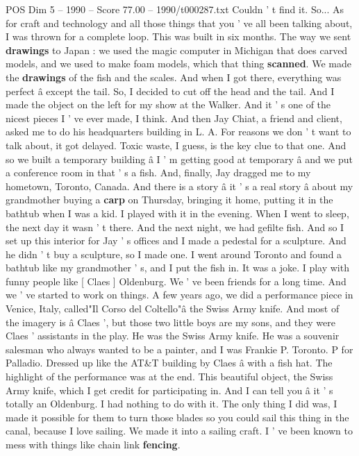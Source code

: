\begin{textsample}{POS Dim 5 – 1990 – Score 77.00 – 1990/t000287.txt}
Couldn ' t find it.
So...
As for craft and technology and all those things that you ' ve all been talking about, I was thrown for a complete loop.
This was built in six months.
The way we sent \textbf{drawings} to Japan : we used the magic computer in Michigan that does carved models, and we used to make foam models, which that thing \textbf{scanned}.
We made the \textbf{drawings} of the fish and the scales.
And when I got there, everything was perfect â except the tail.
So, I decided to cut off the head and the tail.
And I made the object on the left for my show at the Walker.
And it ' s one of the nicest pieces I ' ve ever made, I think.
And then Jay Chiat, a friend and client, asked me to do his headquarters building in L.
A.
For reasons we don ' t want to talk about, it got delayed.
Toxic waste, I guess, is the key clue to that one.
And so we built a temporary building â I ' m getting good at temporary â and we put a conference room in that ' s a fish.
And, finally, Jay dragged me to my hometown, Toronto, Canada.
And there is a story â it ' s a real story â about my grandmother buying a \textbf{carp} on Thursday, bringing it home, putting it in the bathtub when I was a kid.
I played with it in the evening.
When I went to sleep, the next day it wasn ' t there.
And the next night, we had gefilte fish.
And so I set up this interior for Jay ' s offices and I made a pedestal for a sculpture.
And he didn ' t buy a sculpture, so I made one.
I went around Toronto and found a bathtub like my grandmother ' s, and I put the fish in.
It was a joke.
I play with funny people like [ Claes ] Oldenburg.
We ' ve been friends for a long time.
And we ' ve started to work on things.
A few years ago, we did a performance piece in Venice, Italy, called"Il Corso del Coltello"â the Swiss Army knife.
And most of the imagery is â Claes ', but those two little boys are my sons, and they were Claes ' assistants in the play.
He was the Swiss Army knife.
He was a souvenir salesman who always wanted to be a painter, and I was Frankie P.
Toronto.
P for Palladio.
Dressed up like the AT\&T building by Claes â with a fish hat.
The highlight of the performance was at the end.
This beautiful object, the Swiss Army knife, which I get credit for participating in.
And I can tell you â it ' s totally an Oldenburg.
I had nothing to do with it.
The only thing I did was, I made it possible for them to turn those blades so you could sail this thing in the canal, because I love sailing.
We made it into a sailing craft.
I ' ve been known to mess with things like chain link \textbf{fencing}.

\end{textsample}
